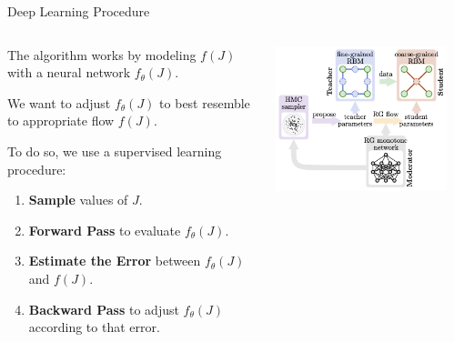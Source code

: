 \documentclass[aspectratio=169, 12pt]{beamer}
\begin{document}
\begin{frame}{Deep Learning Procedure}

    \begin{columns}
        \begin{column}{.6\textwidth}
            
            The algorithm works by modeling $f(J)$ with a neural network $f_\theta(J)$. 

            \vspace{1em}

            We want to adjust $f_\theta(J)$ to best resemble to appropriate flow $f(J)$. 

            To do so, we use a supervised learning procedure:
            \begin{enumerate}
                \item \textbf{Sample} values of $J$. 
                \item \textbf{Forward Pass} to evaluate $f_\theta(J)$. 
                \item \textbf{Estimate the Error} between $f_\theta(J)$ and $f(J)$. 
                \item \textbf{Backward Pass} to adjust $f_\theta(J)$ according to that error. 
            \end{enumerate}
            
        \end{column}
        \begin{column}{.4\textwidth}
            \includegraphics[width=0.9\textwidth]{images/mlrg-architecture.png}
        \end{column}
    \end{columns}
\end{frame}
\end{document}
